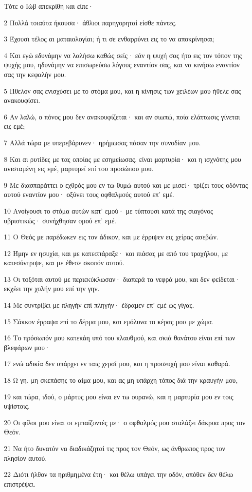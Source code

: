\par Τότε ο Ιώβ απεκρίθη και είπε·
\par 2 Πολλά τοιαύτα ήκουσα· άθλιοι παρηγορηταί είσθε πάντες.
\par 3 Έχουσι τέλος αι ματαιολογίαι; ή τι σε ενθαρρύνει εις το να αποκρίνησαι;
\par 4 Και εγώ εδυνάμην να λαλήσω καθώς σείς· εάν η ψυχή σας ήτο εις τον τόπον της ψυχής μου, ηδυνάμην να επισωρεύσω λόγους εναντίον σας, και να κινήσω εναντίον σας την κεφαλήν μου.
\par 5 Ήθελον σας ενισχύσει με το στόμα μου, και η κίνησις των χειλέων μου ήθελε σας ανακουφίσει.
\par 6 Αν λαλώ, ο πόνος μου δεν ανακουφίζεται· και αν σιωπώ, ποία ελάττωσις γίνεται εις εμέ;
\par 7 Αλλά τώρα με υπερεβάρυνεν· ηρήμωσας πάσαν την συνοδίαν μου.
\par 8 Και αι ρυτίδες με τας οποίας με εσημείωσας, είναι μαρτυρία· και η ισχνότης μου ανισταμένη εις εμέ, μαρτυρεί επί του προσώπου μου.
\par 9 Με διασπαράττει ο εχθρός μου εν τω θυμώ αυτού και με μισεί· τρίζει τους οδόντας αυτού εναντίον μου· οξύνει τους οφθαλμούς αυτού επ' εμέ.
\par 10 Ανοίγουσι το στόμα αυτών κατ' εμού· με τύπτουσι κατά της σιαγόνος υβριστικώς· συνήχθησαν ομού επ' εμέ.
\par 11 Ο Θεός με παρέδωκεν εις τον άδικον, και με έρριψεν εις χείρας ασεβών.
\par 12 Ήμην εν ησυχία, και με κατεσπάραξε· και πιάσας με από του τραχήλου, με κατεσύντριψε, και με έθεσε σκοπόν αυτού.
\par 13 Οι τοξόται αυτού με περιεκύκλωσαν· διαπερά τα νεφρά μου, και δεν φείδεται· εκχέει την χολήν μου επί την γην.
\par 14 Με συντρίβει με πληγήν επί πληγήν· έδραμεν επ' εμέ ως γίγας.
\par 15 Σάκκον έρραψα επί το δέρμα μου, και εμόλυνα το κέρας μου με χώμα.
\par 16 Το πρόσωπόν μου κατεκάη υπό του κλαυθμού, και σκιά θανάτου είναι επί των βλεφάρων μου·
\par 17 ενώ αδικία δεν υπάρχει εν ταις χερσί μου, και η προσευχή μου είναι καθαρά.
\par 18 Ω γη, μη σκεπάσης το αίμα μου, και ας μη υπάρχη τόπος διά την κραυγήν μου,
\par 19 και τώρα, ιδού, ο μάρτυς μου είναι εν τω ουρανώ, και η μαρτυρία μου εν τοις υψίστοις.
\par 20 Οι φίλοι μου είναι οι εμπαίζοντές με· ο οφθαλμός μου σταλάζει δάκρυα προς τον Θεόν.
\par 21 Να ήτο δυνατόν να διαδικάζηταί τις προς τον Θεόν, ως άνθρωπος προς τον πλησίον αυτού.
\par 22 Διότι ήλθον τα ηριθμημένα έτη· και θέλω υπάγει την οδόν, οπόθεν δεν θέλω επιστρέψει.


